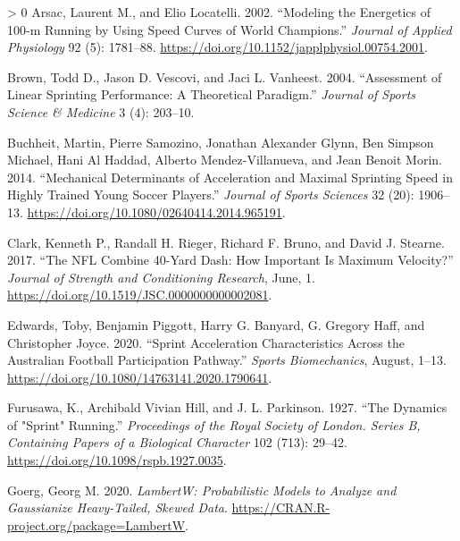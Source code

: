 \documentclass[fleqn,10pt,lineno]{wlpeerj} %
\newlength{\cslhangindent}
\newenvironment{CSLReferences}[3] %
 {%
  \setlength{\parindent}{0pt}
  \ifodd #1 \everypar{\setlength{\hangindent}{\cslhangindent}}\ignorespaces\fi
  \ifnum #2 > 0
  \setlength{\parskip}{#2\baselineskip}
  \fi
 }%
 {}
\begin{document}
\hypertarget{refs}{}
\begin{CSLReferences}{1}{0}
\leavevmode\hypertarget{ref-arsacModelingEnergetics100m2002}{}%
Arsac, Laurent M., and Elio Locatelli. 2002. {``Modeling the Energetics of 100-m Running by Using Speed Curves of World Champions.''} \emph{Journal of Applied Physiology} 92 (5): 1781--88. \url{https://doi.org/10.1152/japplphysiol.00754.2001}.

\leavevmode\hypertarget{ref-brownAssessmentLinearSprinting2004}{}%
Brown, Todd D., Jason D. Vescovi, and Jaci L. Vanheest. 2004. {``Assessment of Linear Sprinting Performance: A Theoretical Paradigm.''} \emph{Journal of Sports Science \& Medicine} 3 (4): 203--10.

\leavevmode\hypertarget{ref-buchheitMechanicalDeterminantsAcceleration2014}{}%
Buchheit, Martin, Pierre Samozino, Jonathan Alexander Glynn, Ben Simpson Michael, Hani Al Haddad, Alberto Mendez-Villanueva, and Jean Benoit Morin. 2014. {``Mechanical Determinants of Acceleration and Maximal Sprinting Speed in Highly Trained Young Soccer Players.''} \emph{Journal of Sports Sciences} 32 (20): 1906--13. \url{https://doi.org/10.1080/02640414.2014.965191}.

\leavevmode\hypertarget{ref-clarkNFLCombine40Yard2017}{}%
Clark, Kenneth P., Randall H. Rieger, Richard F. Bruno, and David J. Stearne. 2017. {``The {NFL Combine} 40-{Yard Dash}: {How Important} Is {Maximum Velocity}?''} \emph{Journal of Strength and Conditioning Research}, June, 1. \url{https://doi.org/10.1519/JSC.0000000000002081}.

\leavevmode\hypertarget{ref-edwardsSprintAccelerationCharacteristics2020}{}%
Edwards, Toby, Benjamin Piggott, Harry G. Banyard, G. Gregory Haff, and Christopher Joyce. 2020. {``Sprint Acceleration Characteristics Across the {Australian} Football Participation Pathway.''} \emph{Sports Biomechanics}, August, 1--13. \url{https://doi.org/10.1080/14763141.2020.1790641}.

\leavevmode\hypertarget{ref-doi:10.1098ux2frspb.1927.0035}{}%
Furusawa, K., Archibald Vivian Hill, and J. L. Parkinson. 1927. {``The Dynamics of "Sprint" Running.''} \emph{Proceedings of the Royal Society of London. Series B, Containing Papers of a Biological Character} 102 (713): 29--42. \url{https://doi.org/10.1098/rspb.1927.0035}.

\leavevmode\hypertarget{ref-R-LambertW}{}%
Goerg, Georg M. 2020. \emph{LambertW: Probabilistic Models to Analyze and Gaussianize Heavy-Tailed, Skewed Data}. \url{https://CRAN.R-project.org/package=LambertW}.


\end{CSLReferences}
\end{document}
